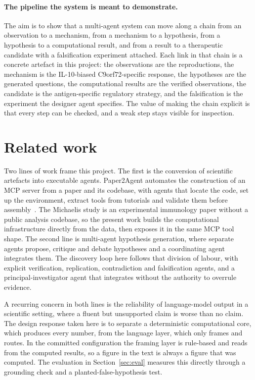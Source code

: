 \documentclass[11pt]{article}
\begin{document}
\paragraph{The pipeline the system is meant to demonstrate.}
The aim is to show that a
multi-agent system can move along a chain from an observation to a mechanism, from a mechanism to a
hypothesis, from a hypothesis to a computational result, and from a result to a therapeutic
candidate with a falsification experiment attached. Each link in that chain is a concrete artefact
in this project: the observations are the reproductions, the mechanism is the IL-10-biased
C9orf72-specific response, the hypotheses are the generated questions, the computational results are
the verified observations, the candidate is the antigen-specific regulatory strategy, and the
falsification is the experiment the designer agent specifies. The value of making the chain explicit
is that every step can be checked, and a weak step stays visible for inspection.

\section{Related work}
Two lines of work frame this project. The first is the conversion of scientific artefacts into
executable agents. Paper2Agent automates the construction of an MCP server from a paper and its
codebase, with agents that locate the code, set up the environment, extract tools from tutorials
and validate them before assembly~\citep{miao2025paper2agent}. The Michaelis study is an
experimental immunology paper without a public analysis codebase, so the present work builds the
computational infrastructure directly from the data, then exposes it
in the same MCP tool shape. The second line is multi-agent hypothesis generation, where separate
agents propose, critique and debate hypotheses and a coordinating agent integrates them. The
discovery loop here follows that division of labour, with explicit verification, replication,
contradiction and falsification agents, and a principal-investigator agent that integrates without
the authority to overrule evidence.

A recurring concern in both lines is the reliability of language-model output in a scientific
setting, where a fluent but unsupported claim is worse than no claim. The design response taken
here is to separate a deterministic computational core, which produces every number, from the
language layer, which only frames and routes. In the committed configuration the framing layer is
rule-based and reads from the computed results, so a figure in the text is always a figure that was
computed. The evaluation in Section~\ref{sec:eval} measures this directly through a grounding check
and a planted-false-hypothesis test.
\end{document}
